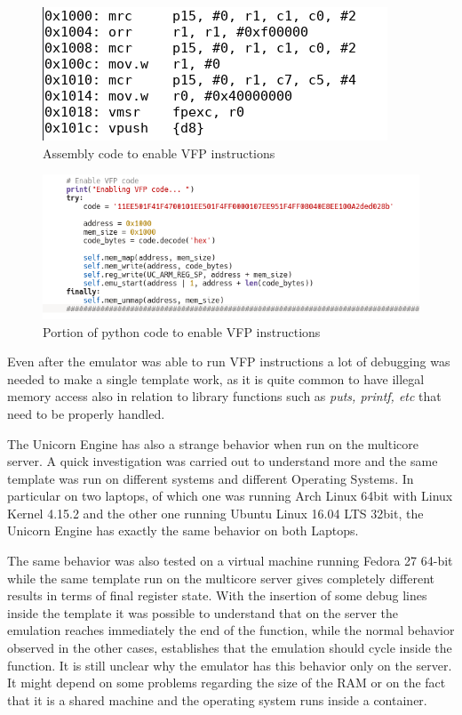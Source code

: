\documentclass[../main.tex]{subfiles}
\begin{document}
\begin{figure}[htp]
  \centering
  \includegraphics[scale=0.9]{images/vfpdisass.png}
  \caption{Assembly code to enable VFP instructions}
  \label{fig:vfp}
\end{figure}
\begin{figure}[htp]
  \centering
  \includegraphics[scale=0.9]{images/vfpcode.png}
  \caption{Portion of python code to enable VFP instructions}
  \label{fig:vfp1}
\end{figure}

Even after the emulator was able to run VFP instructions a lot of debugging was needed to make a single template work, as it is quite common to have illegal memory access also in relation to library functions such as \textit{puts, printf, etc} that need to be properly handled.

The Unicorn Engine has also a strange behavior when run on the multicore server. A quick investigation was carried out to understand more and the same template was run on different systems and different Operating Systems. In particular on two laptops, of which one was running Arch Linux 64bit with Linux Kernel 4.15.2 and the other one running Ubuntu Linux 16.04 LTS 32bit, the Unicorn Engine has exactly the same behavior on both Laptops.

The same behavior was also tested on a virtual machine running Fedora 27 64-bit while the same template run on the multicore server gives completely different results in terms of final register state. With the insertion of some debug lines inside the template it was possible to understand that on the server the emulation reaches immediately the end of the function, while the normal behavior observed in the other cases, establishes that the emulation should cycle inside the function. It is still unclear why the emulator has this behavior only on the server. It might depend on some problems regarding the size of the RAM or on the fact that it is a shared machine and the operating system runs inside a container.
\end{document}
